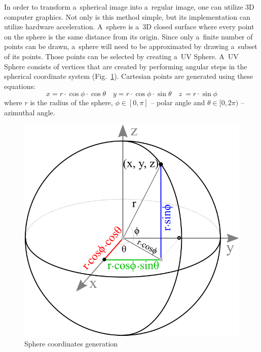 \documentclass[conference]{ieeetran}
\begin{document}
In order to transform a~spherical image into a~regular image, one can utilize 3D computer graphics.
Not only is this method simple, but its implementation can utilize hardware acceleration.
A~sphere is a~3D closed surface where every point on the sphere is the same distance from its origin. %
Since only a~finite number of points can be drawn, a~sphere will need to be approximated by drawing a~subset of its points.
Those points can be selected by creating a~UV Sphere.
A~UV Sphere consists of vertices that are created by performing angular steps in the spherical coordinate system (Fig.~\ref{fig:spheresa}).
Cartesian points are generated using these equations:
\begin{equation}
    x = r \cdot \cos \phi \cdot \cos \theta \quad y = r \cdot \cos \phi \cdot \sin \theta \quad z~= r \cdot \sin \phi \nonumber
\end{equation}
where $r$ is the radius of the sphere, $\phi \in [0, \pi]$ -- polar angle and $\theta \in [0, 2\pi)$ -- azimuthal angle.


\begin{figure}[ht!]
    \centering
    \includegraphics[width=0.5\columnwidth]{img/genpoint}
    \caption{Sphere coordinates generation}
    \label{fig:spheresa}
\end{figure}
\end{document}
